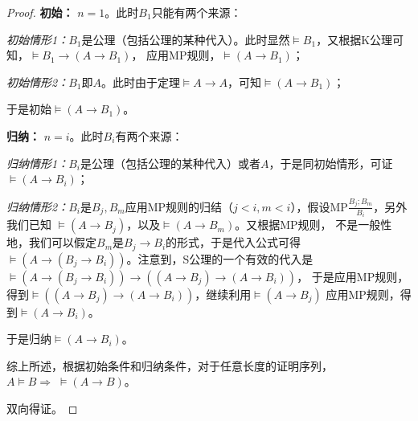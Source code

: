 \begin{proof}
    \textbf{初始：} $n=1$。此时$B_1$只能有两个来源：

    \textit{初始情形1：}$B_1$是公理（包括公理的某种代入）。此时显然$\models B_1$，又根据K公理可知，$\models B_1\rightarrow (A \rightarrow B_1)$，
    应用MP规则，$\models (A \rightarrow B_1)$；

    \textit{初始情形2：}$B_1$即$A$。此时由于定理$\models A\rightarrow A$，可知$\models (A \rightarrow B_1)$；
    
    于是初始$\models (A \rightarrow B_1)$。

    \textbf{归纳：} $n=i$。此时$B_i$有两个来源：

    \textit{归纳情形1：}$B_i$是公理（包括公理的某种代入）或者$A$，于是同初始情形，可证$\models (A \rightarrow B_i)$；

    \textit{归纳情形2：}$B_i$是$B_j,B_m$应用MP规则的归结（$j<i,m<i$），假设MP$\frac{B_j;B_m}{B_i}$，另外我们已知
    $\models (A \rightarrow B_j)$，以及$\models (A \rightarrow B_m)$。又根据MP规则，
    不是一般性地，我们可以假定$B_m$是$B_j\rightarrow B_i$的形式，于是代入公式可得
    $\models (A \rightarrow (B_j\rightarrow B_i))$。注意到，S公理的一个有效的代入是
    $\models (A \rightarrow (B_j \rightarrow B_i))\rightarrow ((A\rightarrow B_j)\rightarrow(A\rightarrow B_i))$，
    于是应用MP规则，得到$\models ((A\rightarrow B_j)\rightarrow(A\rightarrow B_i))$，继续利用$\models (A \rightarrow B_j)$
    应用MP规则，得到$\models (A \rightarrow B_i)$。

    于是归纳$\models (A \rightarrow B_i)$。

    综上所述，根据初始条件和归纳条件，对于任意长度的证明序列，$A\models B \Rightarrow\; \models (A \rightarrow B)$。

    双向得证。
\end{proof}